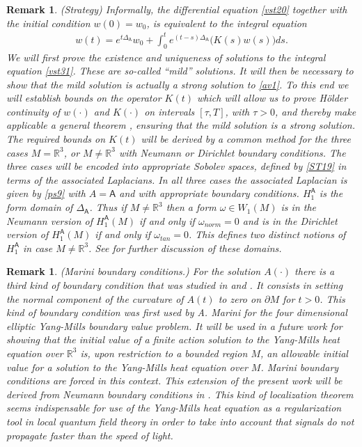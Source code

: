 \documentclass[12pt]{article}
\newtheorem{remark}[theorem]{Remark}
\def \R{\mathbb R}
\def \As{\mathsf{A}}
\def \w{\omega}
\def \p{\partial}
\def \eref{\eqref}
\numberwithin{equation}{section}
\begin{document}
\begin{remark}\label{strat4} {\rm (Strategy) 
Informally, the differential equation \eref{vst20} 
together with the initial condition $w(0) = w_0$, is equivalent to the integral equation
\begin{align}
 w(t) = e^{t\Delta_\As} w_0 + \int_0^t e^{(t-s) \Delta_\As}\Big(K(s)w(s) \Big) ds.                    \label{vst31}
 \end{align}
 We will first  prove the existence and uniqueness of solutions to the integral equation
  \eref{vst31}. These are so-called ``mild'' solutions. It will then be necessary to show
  that the mild solution is actually a strong solution to \eref{av1}. 
  To this end we will   establish  bounds on  the   operator $K(t)$ which will
   allow us to prove H\"older continuity of $w(\cdot)$ and $K(\cdot)$ 
  on intervals $[\tau, T]$, with $\tau >0$,  and thereby make applicable a general theorem
 \cite[Theorem 11.44]{RR},    
 ensuring that the mild
  solution is a strong solution. The required bounds on $K(t)$ will be derived by a common method for
   the three cases   $M=\R^3$, or $M\ne \R^3$ 
   with Neumann or Dirichlet boundary conditions.  
  The three cases will be encoded into appropriate Sobolev spaces, defined by \eref{ST19} in 
  terms of the associated Laplacians.      
  In all three cases the associated Laplacian is given by
  \eref{ps9} with $A = \As$ and with appropriate boundary conditions. 
   $H_1^\As$ is  the form domain of $\Delta_\As$. 
       Thus if $M \ne \R^3$ then a form $\w \in W_1(M)$ is in the Neumann version of $H_1^\As(M)$
      if and only if $\w_{norm}=0$ and is in the Dirichlet version of $H_1^\As(M)$
      if and only if $\w_{tan}=0$. This defines two distinct notions of $H_1^\As$ in case $M \ne \R^3$.  
    See  \cite[Remark 4.10]{CG1}   for further discussion of these   domains.  
  }
\end{remark}


      \begin{remark}\label{remMar} {\rm (Marini boundary conditions.) For the solution $A(\cdot)$ there is
a third kind of boundary condition that was studied in \cite{CG1} and \cite{CG2}. It consists in setting
the normal component of the curvature of $A(t)$ to zero on $\p M$ for $t >0$. This kind of boundary
condition was first used by A. Marini \cite{Ma3,Ma4,Ma7,Ma8} for the four dimensional elliptic Yang-Mills
boundary value problem. It will be used in a future work \cite{G73} for showing that the initial value
of a finite action solution  to the Yang-Mills heat  equation over $\R^3$ is, upon restriction
to a bounded region $M$,  an allowable initial value for a solution to the Yang-Mills
heat equation over $M$. Marini boundary conditions are forced in this context. This extension
of the present work will be derived from Neumann boundary conditions in \cite{G73}. This kind of localization
theorem seems indispensable for use of  the Yang-Mills heat equation as a regularization tool in local
quantum field theory in order to take into account that signals do not propagate faster than the speed of light.
}
\end{remark}
\end{document}
